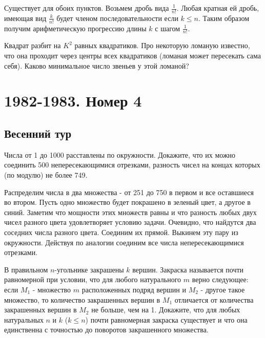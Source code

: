 \documentclass[11pt, a4paper]{common/document_template}
\begin{document}
\begin{Solution}
Существует для обоих пунктов. Возьмем дробь вида $\frac{1}{n!}$. Любая кратная ей дробь, имеющая вид
$\frac{k}{n!}$ будет членом последовательности если $k \leqslant n$. Таким образом получим арифметическую прогрессию длины $k$ с шагом $\frac{1}{n!}$.
\end{Solution}

\begin{exercise}
Квадрат разбит на $K^{2}$ равных квадратиков. Про некоторую ломаную известно, что она проходит через центры всех квадратиков (ломаная может пересекать сама себя). Каково минимальное число звеньев у этой ломаной?
\end{exercise}

\chapter{1982-1983. Номер 4}

\section{Весенний тур}

\begin{exercise}
Числа от 1 до 1000 расставлены по окружности. Докажите, что их можно соединить 500 непересекающимися отрезками, разность чисел на концах которых (по модулю) не более 749.
\end{exercise}

\begin{Solution}
Распределим числа в два множества - от 251 до 750 в первом и все оставшиеся во втором. Пусть одно множество будет покрашено в зеленый цвет, а другое в синий. Заметим что мощности этих множеств равны и что разность любых двух чисел разного цвета удовлетворяет условию задачи. Очевидно, что найдутся два соседних числа разного цвета. Соединим их прямой. Выкинем эту пару из окружности. Действуя по аналогии соединим все числа непересекающимися отрезками. 
\end{Solution}


\begin{exercise}
В правильном $n$-угольнике закрашены $k$ вершин. Закраска называется почти равномерной при условии, что для любого натурального $m$ верно следующее: если $M_{1}$ - множество $m$ расположенных подряд вершин и $M_{2}$ - другое такое множество, то количество закрашенных вершин в $M_{1}$ отличается от количества закрашенных вершин в $M_{2}$ не больше, чем на 1. Докажите, что для любых натуральных $n$ и $k$ ($k \leqslant n$) почти равномерная закраска существует и что она единственна с точностью до поворотов закрашенного множества.
\end{exercise}
\end{document}
